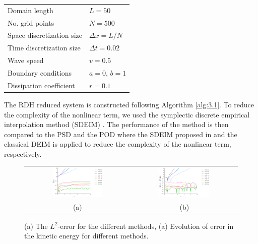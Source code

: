 \vspace{0.5cm}
\begin{center}
\begin{tabular}{|l|l|}
\hline
Domain length & $L = 50$ \\
No. grid points & $N = 500$ \\
Space discretization size & $\Delta x = L/N$ \\
Time discretization size & $\Delta t = 0.02$ \\
Wave speed & $v = 0.5$ \\
Boundary conditions & $a = 0$, $b=1$\\
Dissipation coefficient & $r = 0.1$ \\
\hline
\end{tabular}
\end{center}
\vspace{0.5cm}

The RDH reduced system is constructed following Algorithm \ref{alg:3.1}. To reduce the complexity of the nonlinear term, we used the symplectic discrete empirical interpolation method (SDEIM) \cite{Maboudi:2016}. The performance of the method is then compared to the PSD and the POD where the SDEIM proposed in \cite{Peng:2014di} and the classical DEIM \cite{Chaturantabut:2010cz} is applied to reduce the complexity of the nonlinear term, respectively. 


\begin{figure}[t]
\begin{tabular}{cc}
\includegraphics[width=0.5\textwidth]{./figs/wave_nonlin/error} & 
\includegraphics[width=0.5\textwidth]{./figs/wave_nonlin/energy} \\
(a) & (b)
\end{tabular}
\caption{(a) The $L^2$-error for the different methods, (a) Evolution of error in the kinetic energy for different methods.} \label{fig:added4.1}
\end{figure}

